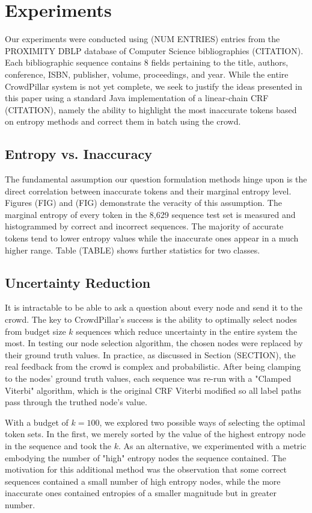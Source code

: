 \section{Experiments}
Our experiments were conducted using (NUM ENTRIES) entries from the PROXIMITY DBLP database of Computer Science bibliographies (CITATION).  Each bibliographic sequence contains 8 fields pertaining to the title, authors, conference, ISBN, publisher, volume, proceedings, and year.  While the entire CrowdPillar system is not yet complete, we seek to justify the ideas presented in this paper using a standard Java implementation of a linear-chain CRF (CITATION), namely the ability to highlight the most inaccurate tokens based on entropy methods and correct them in batch using the crowd.

\subsection{Entropy vs. Inaccuracy}
The fundamental assumption our question formulation methods hinge upon is the direct correlation between inaccurate tokens and their marginal entropy level.  Figures (FIG) and (FIG) demonstrate the veracity of this assumption.  The marginal entropy of every token in the 8,629 sequence test set is measured and histogrammed by correct and incorrect sequences. The majority of accurate tokens tend to lower entropy values while the inaccurate ones appear in a much higher range.  Table (TABLE) shows further statistics for two classes.

\subsection{Uncertainty Reduction}
It is intractable to be able to ask a question about every node and send it to the crowd.  The key to CrowdPillar's success is the ability to optimally select nodes from budget size $k$ sequences which reduce uncertainty in the entire system the most.  In testing our node selection algorithm, the chosen nodes were replaced by their ground truth values.  In practice, as discussed in Section (SECTION), the real feedback from the crowd is complex and probabilistic.  After being clamping to the nodes' ground truth values, each sequence was re-run with a "Clamped Viterbi" algorithm, which is the original CRF Viterbi modified so all label paths pass through the truthed node's value.

With a budget of $k=100$, we explored two possible ways of selecting the optimal token sets.  In the first, we merely sorted by the value of the highest entropy node in the sequence and took the $k$.  As an alternative, we experimented with a metric embodying the number of "high" entropy nodes the sequence contained.  The motivation for this additional method was the observation that some correct sequences contained a small number of high entropy nodes, while the more inaccurate ones contained entropies of a smaller magnitude but in greater number.

